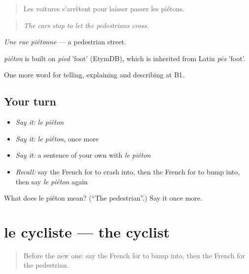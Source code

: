 \begin{quote}
Les voitures s'arrêtent pour laisser passer les piétons.
\end{quote}

\begin{quote}
\emph{The cars stop to let the pedestrians cross.}
\end{quote}

\emph{Une rue piétonne} — a pedestrian street.

\begin{cousinweb}
\emph{piéton} is built on \emph{pied} 'foot' (EtymDB), which is inherited from Latin \emph{pēs} 'foot'.
\end{cousinweb}

\begin{grammarlens}[title={What you've built}]
One more word for telling, explaining and describing at B1.
\end{grammarlens}

\subsection*{Your turn}
\begin{itemize}
\raggedright
  \item \emph{Say it:} \emph{le piéton}
  \item \emph{Say it:} \emph{le piéton}, once more
  \item \emph{Say it:} a sentence of your own with \emph{le piéton}
  \item \emph{Recall:} say the French for to crash into, then the French for to bump into, then say \emph{le piéton} again
\end{itemize}

\begin{tcolorbox}[breakable,colback=teal!4,colframe=teal!35!black,title={Before you move on}]
What does le piéton mean? (\textquotedblleft{}The pedestrian\textquotedblright{}.) Say it once more.
\end{tcolorbox}
\section[le cycliste]{le cycliste — the cyclist}

\label{lesson:FR-C411-cycliste}



\begin{quote}
Before the new one: say the French for to bump into, then the French for the pedestrian.
\end{quote}

